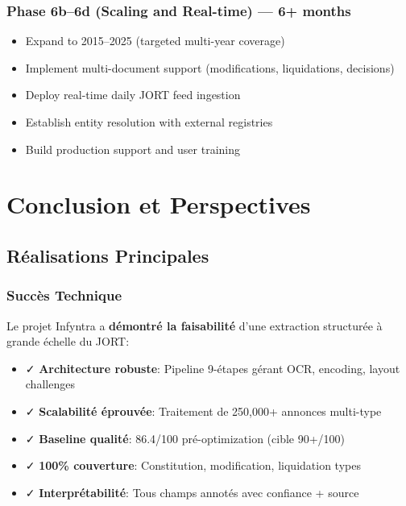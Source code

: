 \documentclass[12pt,a4paper]{report}
\begin{document}
\subsection{Phase 6b--6d (Scaling and Real-time) — 6+ months}

\begin{itemize}
    \item Expand to 2015--2025 (targeted multi-year coverage)
    \item Implement multi-document support (modifications, liquidations, decisions)
    \item Deploy real-time daily JORT feed ingestion
    \item Establish entity resolution with external registries
    \item Build production support and user training
\end{itemize}

\chapter{Conclusion et Perspectives}

\section{Réalisations Principales}

\subsection{Succès Technique}

Le projet Infyntra a \textbf{démontré la faisabilité} d'une extraction structurée à grande échelle du JORT:

\begin{itemize}
    \item ✓ \textbf{Architecture robuste}: Pipeline 9-étapes gérant OCR, encoding, layout challenges
    \item ✓ \textbf{Scalabilité éprouvée}: Traitement de 250,000+ annonces multi-type
    \item ✓ \textbf{Baseline qualité}: 86.4/100 pré-optimization (cible 90+/100)
    \item ✓ \textbf{100\% couverture}: Constitution, modification, liquidation types
    \item ✓ \textbf{Interprétabilité}: Tous champs annotés avec confiance + source
\end{itemize}
\end{document}
